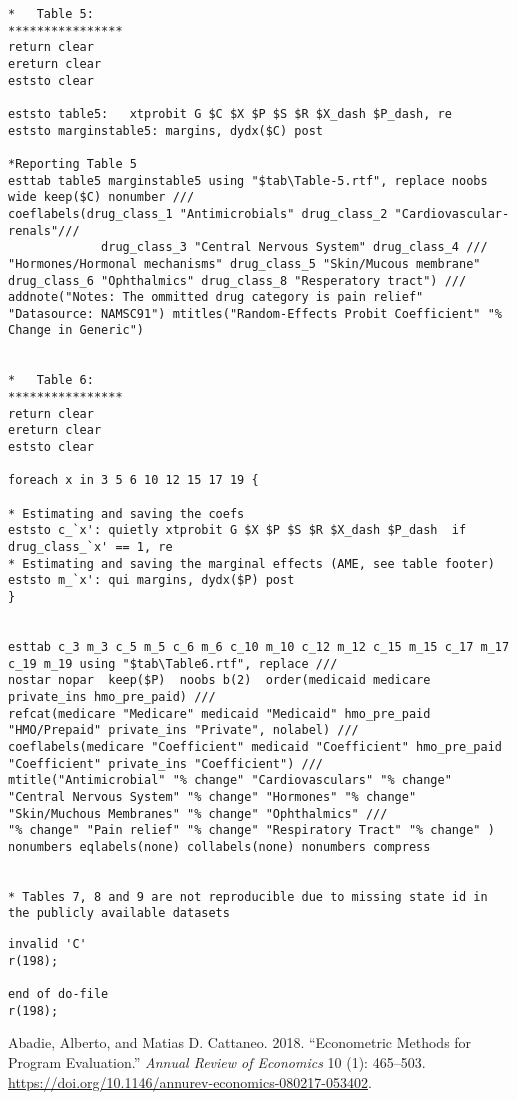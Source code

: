 \documentclass[
]{book}
\begin{document}
\begin{verbatim}
*   Table 5:
****************
return clear
ereturn clear
eststo clear

eststo table5:   xtprobit G $C $X $P $S $R $X_dash $P_dash, re
eststo marginstable5: margins, dydx($C) post

*Reporting Table 5
esttab table5 marginstable5 using "$tab\Table-5.rtf", replace noobs wide keep($C) nonumber ///
coeflabels(drug_class_1 "Antimicrobials" drug_class_2 "Cardiovascular-renals"///
             drug_class_3 "Central Nervous System" drug_class_4 ///
"Hormones/Hormonal mechanisms" drug_class_5 "Skin/Mucous membrane" drug_class_6 "Ophthalmics" drug_class_8 "Resperatory tract") ///
addnote("Notes: The ommitted drug category is pain relief" "Datasource: NAMSC91") mtitles("Random-Effects Probit Coefficient" "% Change in Generic") 


*   Table 6:
****************
return clear
ereturn clear
eststo clear

foreach x in 3 5 6 10 12 15 17 19 {

* Estimating and saving the coefs
eststo c_`x': quietly xtprobit G $X $P $S $R $X_dash $P_dash  if drug_class_`x' == 1, re
* Estimating and saving the marginal effects (AME, see table footer)
eststo m_`x': qui margins, dydx($P) post
}


esttab c_3 m_3 c_5 m_5 c_6 m_6 c_10 m_10 c_12 m_12 c_15 m_15 c_17 m_17 c_19 m_19 using "$tab\Table6.rtf", replace ///
nostar nopar  keep($P)  noobs b(2)  order(medicaid medicare private_ins hmo_pre_paid) ///
refcat(medicare "Medicare" medicaid "Medicaid" hmo_pre_paid "HMO/Prepaid" private_ins "Private", nolabel) ///
coeflabels(medicare "Coefficient" medicaid "Coefficient" hmo_pre_paid "Coefficient" private_ins "Coefficient") ///
mtitle("Antimicrobial" "% change" "Cardiovasculars" "% change" "Central Nervous System" "% change" "Hormones" "% change" "Skin/Muchous Membranes" "% change" "Ophthalmics" ///
"% change" "Pain relief" "% change" "Respiratory Tract" "% change" ) nonumbers eqlabels(none) collabels(none) nonumbers compress


* Tables 7, 8 and 9 are not reproducible due to missing state id in the publicly available datasets
\end{verbatim}

\begin{verbatim}
invalid 'C' 
r(198);

end of do-file
r(198);
\end{verbatim}

\hypertarget{refs}{}
\leavevmode\hypertarget{ref-abadie_econometric_2018}{}%
Abadie, Alberto, and Matias D. Cattaneo. 2018. ``Econometric Methods for
Program Evaluation.'' \emph{Annual Review of Economics} 10 (1):
465--503. \url{https://doi.org/10.1146/annurev-economics-080217-053402}.
\end{document}
